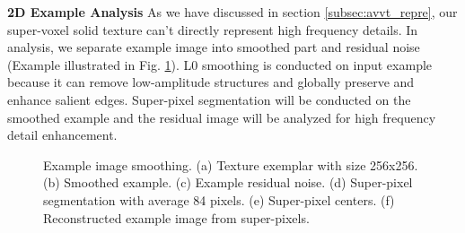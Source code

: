 \noindent
\textbf{2D Example Analysis}
As we have discussed in section \ref{subsec:avvt_repre}, our super-voxel solid texture can't directly represent high frequency details. In analysis, we separate example image into smoothed part and residual noise (Example illustrated in Fig. \ref{fig:exmp_smoothing}). L0 smoothing \cite{xu2011image} is conducted on input example because it can remove low-amplitude  structures and globally preserve and enhance salient edges. Super-pixel segmentation will be conducted on the smoothed example and the residual image will be analyzed for high frequency detail enhancement.
\begin{figure}[t!]
	\centering
	\caption{Example image smoothing. (a) Texture exemplar with size 256x256. (b) Smoothed example. (c) Example residual noise. (d) Super-pixel segmentation with average 84 pixels. (e) Super-pixel centers. (f) Reconstructed example image from super-pixels.}
	\label{fig:exmp_smoothing}
\end{figure}

